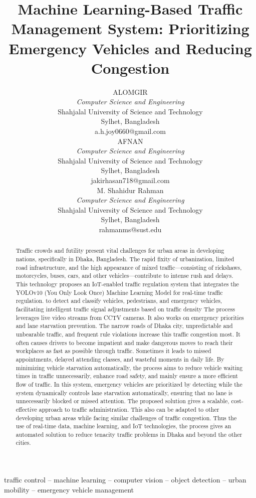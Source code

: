 \documentclass[usenatbib]{tjaa}
\title[]{\centering Machine Learning-Based Traffic Management System: Prioritizing Emergency Vehicles and Reducing Congestion}
\author[]{
    \begin{minipage}[t]{0.32\textwidth}
        \centering
        \normalsize
         ALOMGIR \\ 
        \textit{\normalsize Computer Science and Engineering} \\
        \normalsize Shahjalal University of Science and Technology \\
        \normalsize Sylhet, Bangladesh \\
        \normalsize a.h.joy0660@gmail.com
    \end{minipage}
    \hspace{0.01\textwidth} %
    \begin{minipage}[t]{0.32\textwidth}
        \centering
        \normalsize
         AFNAN\\
        \textit{\normalsize Computer Science and Engineering} \\
        \normalsize Shahjalal University of Science and Technology \\
        \normalsize Sylhet, Bangladesh \\
        \normalsize jakirhasan718@gmail.com
    \end{minipage}
    \hspace{0.01\textwidth} %
    \begin{minipage}[t]{0.32\textwidth}
        \centering
        \normalsize
        M. Shahidur Rahman\\
        \textit{\normalsize Computer Science and Engineering} \\
        \normalsize Shahjalal University of Science and Technology \\
        \normalsize Sylhet, Bangladesh \\
        \normalsize rahmanms@sust.edu
    \end{minipage}
}
\begin{document}
\label{firstpage}
\pagerange{\pageref{firstpage}--\pageref{lastpage}}

\begin{abstract}
Traffic crowds and futility present vital challenges for urban areas in developing nations, specifically in Dhaka, Bangladesh. The rapid fixity of urbanization, limited road infrastructure, and the high appearance of mixed traffic—consisting of rickshaws, motorcycles, buses, cars, and other vehicles—contribute to intense rush and delays. This technology proposes an IoT-enabled traffic regulation system that integrates the YOLOv10 (You Only Look Once) Machine Learning Model for real-time traffic regulation. to detect and classify vehicles, pedestrians, and emergency vehicles, facilitating intelligent traffic signal adjustments based on traffic density The process leverages live video streams from CCTV cameras. It also works on emergency priorities and lane starvation prevention. The narrow roads of Dhaka city, unpredictable and unbearable traffic, and frequent rule violations increase this traffic congestion most. It often causes drivers to become impatient and make dangerous moves to reach their workplaces as fast as possible through traffic. Sometimes it leads to missed appointments, delayed attending classes, and wasteful moments in daily life. By minimizing vehicle starvation automatically, the process aims to reduce vehicle waiting times in traffic unnecessarily, enhance road safety, and mainly ensure a more efficient flow of traffic. In this system, emergency vehicles are prioritized by detecting while the system dynamically controls lane starvation automatically, ensuring that no lane is unnecessarily blocked or missed attention. The proposed solution gives a scalable, cost-effective approach to traffic administration. This also can be adapted to other developing urban areas while facing similar challenges of traffic congestion.  Thus the use of real-time data, machine learning, and IoT technologies, the process gives an automated solution to reduce tenacity traffic problems in Dhaka and beyond the other cities.
\end{abstract}


\begin{keywords}
traffic control -- machine learning -- computer vision -- object detection -- urban mobility -- emergency vehicle management
\end{keywords}
\end{document}
